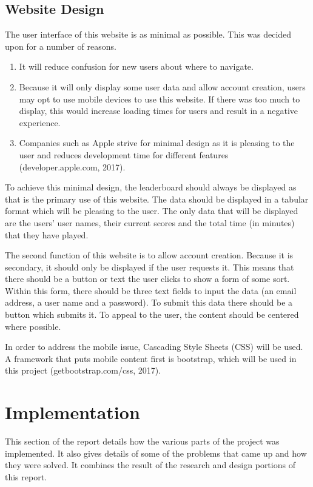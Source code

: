 \documentclass[12pt]{article}
\begin{document}
\subsection{Website Design}
The user interface of this website is as minimal as possible. This was decided upon for a number of reasons.
 
\begin{enumerate}
\item It will reduce confusion for new users about where to navigate.
\item Because it will only display some user data and allow account creation, users may opt to use mobile devices to use this website. If there was too much to display, this would increase loading times for users and result in a negative experience. 
\item Companies such as Apple strive for minimal design as it is pleasing to the user and reduces development time for different features (developer.apple.com, 2017).
\end{enumerate}

To achieve this minimal design, the leaderboard should always be displayed as that is the primary use of this website. The data should be displayed in a tabular format which will be pleasing to the user. The only data that will be displayed are the users' user names, their current scores and the total time (in minutes) that they have played. 

The second function of this website is to allow account creation. Because it is secondary, it should only be displayed if the user requests it. This means that there should be a button or text the user clicks to show a form of some sort. Within this form, there should be three text fields to input the data (an email address, a user name and a password). To submit this data there should be a button which submits it. To appeal to the user, the content should be centered where possible.

In order to address the mobile issue, Cascading Style Sheets (CSS) will be used. A framework that puts mobile content first is bootstrap, which will be used in this project (getbootstrap.com/css, 2017). 

\newpage
\section{Implementation}
This section of the report details how the various parts of the project was implemented. It also gives details of some of the problems that came up and how they were solved. It combines the result of the research and design portions of this report. 
\end{document}
